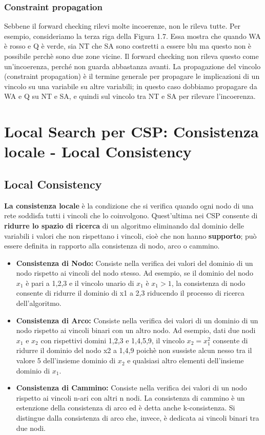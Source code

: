 \subsection{Constraint propagation}
Sebbene il forward checking rilevi molte incoerenze, non le rileva tutte. Per esempio, consideriamo la terza riga della Figura 1.7. Essa mostra che quando WA è rosso e Q è verde, sia NT che SA sono costretti a essere blu ma questo non è possibile perchè sono due zone vicine. Il forward checking non rileva questo come un’incoerenza, perché non guarda abbastanza avanti. La propagazione del vincolo (constraint propagation) è il termine generale per propagare le implicazioni di un vincolo su una variabile su altre variabili; in questo caso dobbiamo propagare da WA e Q su NT e SA, e quindi sul vincolo tra NT e SA per rilevare l’incoerenza.

\chapter{Local Search per CSP: Consistenza locale - Local Consistency} \label{ch:Local Search per Crisp CSP: Consistenza locale}
\section{Local Consistency}
\textbf{La consistenza locale} è la condizione che si verifica quando ogni nodo di una rete soddisfa tutti i vincoli che lo coinvolgono. Quest’ultima nei CSP consente di \textbf{ridurre lo spazio di ricerca} di un algoritmo eliminando dal dominio delle variabili i valori che non rispettano i vincoli, cioè che non hanno \textbf{supporto}; può essere definita in rapporto alla consistenza di nodo, arco o cammino.
\begin{itemize}
    \item \textbf{Consistenza di Nodo:} Consiste nella verifica dei valori del dominio di un nodo rispetto ai vincoli del nodo stesso. Ad esempio, se il dominio del nodo $x_1$ è pari a 1,2,3 e il vincolo unario di $x_1$ è $x_1 > 1$, la consistenza di nodo consente di ridurre il dominio di x1 a 2,3 riducendo il processo di ricerca dell’algoritmo.
    \item \textbf{Consistenza di Arco:} Consiste nella verifica dei valori di un dominio di un nodo rispetto ai vincoli binari con un altro nodo. Ad esempio, dati due nodi $x_1$ e $x_2$ con rispettivi domini 1,2,3 e 1,4,5,9, il vincolo $x_2 = x_{1}^2$ consente di ridurre il dominio del nodo x2 a 1,4,9 poichè non sussiste alcun nesso tra il valore 5 dell’insieme dominio di $x_2$ e qualsiasi altro elementi dell’insieme dominio di $x_1$.
    \item \textbf{Consistenza di Cammino:} Consiste nella verifica dei valori di un nodo rispetto ai vincoli n-ari con altri n nodi. La consistenza di cammino è un estenzione della consistenza di arco ed è detta anche k-consistenza. Si distingue dalla consistenza di arco che, invece, è dedicata ai vincoli binari tra due nodi.
\end{itemize}

